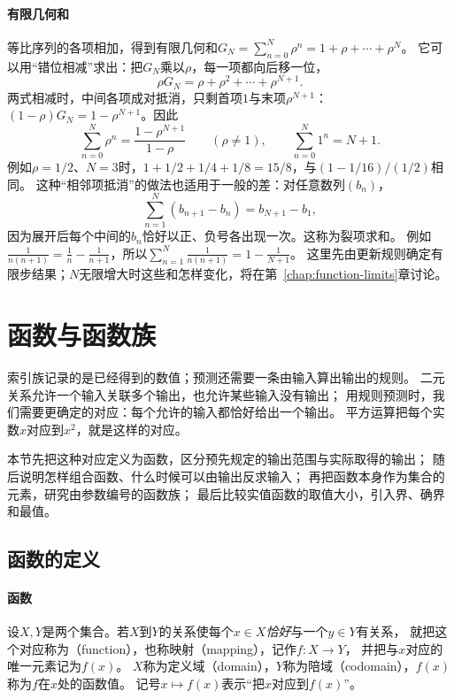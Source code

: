 \paragraph{有限几何和}
等比序列的各项相加，得到有限几何和$G_N=\sum_{n=0}^N\rho^n=1+\rho+\cdots+\rho^N$。
它可以用“错位相减”求出：把$G_N$乘以$\rho$，每一项都向后移一位，
\[
 \rho G_N=\rho+\rho^2+\cdots+\rho^{N+1}.
\]
两式相减时，中间各项成对抵消，只剩首项$1$与末项$\rho^{N+1}$：$(1-\rho)G_N=1-\rho^{N+1}$。因此
\begin{equation}
 \sum_{n=0}^N\rho^n=\frac{1-\rho^{N+1}}{1-\rho}\qquad(\rho\neq1),
 \qquad\sum_{n=0}^N1^n=N+1.
 \label{eq:prelim-finite-geometric-sum}
\end{equation}
例如$\rho=1/2$、$N=3$时，$1+1/2+1/4+1/8=15/8$，与$(1-1/16)/(1/2)$相同。
这种“相邻项抵消”的做法也适用于一般的差：对任意数列$(b_n)$，
\begin{equation}
 \sum_{n=1}^N(b_{n+1}-b_n)=b_{N+1}-b_1,
 \label{eq:prelim-telescoping-sum}
\end{equation}
因为展开后每个中间的$b_n$恰好以正、负号各出现一次。这称为裂项求和。
例如$\frac1{n(n+1)}=\frac1n-\frac1{n+1}$，所以$\sum_{n=1}^N\frac1{n(n+1)}=1-\frac1{N+1}$。
这里先由更新规则确定有限步结果；$N$无限增大时这些和怎样变化，将在第~\ref{chap:function-limits}章讨论。

\section{函数与函数族}
\label{sec:prelim-functions-value-ranges}

索引族记录的是已经得到的数值；预测还需要一条由输入算出输出的规则。
二元关系允许一个输入关联多个输出，也允许某些输入没有输出；
用规则预测时，我们需要更确定的对应：每个允许的输入都恰好给出一个输出。
平方运算把每个实数$x$对应到$x^2$，就是这样的对应。

本节先把这种对应定义为函数，区分预先规定的输出范围与实际取得的输出；
随后说明怎样组合函数、什么时候可以由输出反求输入；
再把函数本身作为集合的元素，研究由参数编号的函数族；
最后比较实值函数的取值大小，引入界、确界和最值。

\subsection{函数的定义}
\label{sec:prelim-function-definition}

\paragraph{函数}
设$X,Y$是两个集合。若$X$到$Y$的关系使每个$x\in X$\emph{恰好}与一个$y\in Y$有关系，
就把这个对应称为（function），也称映射（mapping），记作$f:X\to Y$，
并把与$x$对应的唯一元素记为$f(x)$。
$X$称为定义域（domain），$Y$称为陪域（codomain），$f(x)$称为$f$在$x$处的函数值。
记号$x\mapsto f(x)$表示“把$x$对应到$f(x)$”。

